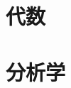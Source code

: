 \documentclass[11pt, a4paper, twoside, openany, UTF8]{ctexbook}
\begin{document}
\maketitle
\frontmatter	
\listoftodos

\tableofcontents

\mainmatter
\part{代数}


\part{分析学}


%
%
%
%
%
%
%
%
%
%
%
%
%
%
\end{document}
